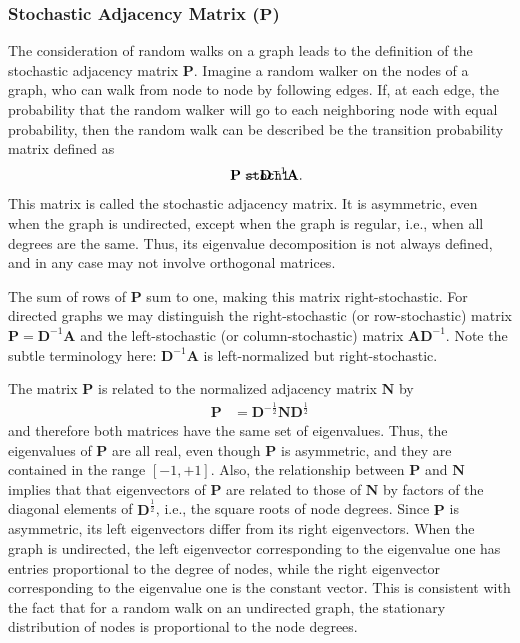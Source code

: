 \documentclass{article}
\def\mathnote#1{%
  \tag*{\rlap{\hspace\marginparsep\smash{\parbox[t]{\marginparwidth}{#1}}}}
}
\begin{document}
\subsubsection{Stochastic Adjacency Matrix ($\mathbf P$)}
\label{sec:matrix.P}
The consideration of random walks on a graph leads to the definition of
the stochastic adjacency matrix $\mathbf P$.  Imagine a random walker on
the nodes of a graph, who can walk from node to node by following
edges.  If, at each edge, the probability that the random walker will go
to each neighboring node with equal probability, then the random walk
can be described be the transition probability matrix defined as
\begin{align}
  \mathnote{\texttt{stoch1}}
  \mathbf P &= \mathbf D^{-1} \mathbf A.
\end{align}
This matrix is called the stochastic adjacency matrix.  It is asymmetric,
even when the graph is undirected, except when the graph is regular,
i.e., when all degrees are the same.  
Thus, its eigenvalue decomposition
is not always defined, and in any case may not involve orthogonal
matrices. 

The sum of rows of $\mathbf P$ sum to one, making this matrix
right-stochastic. 
For directed graphs we may distinguish the right-stochastic (or
row-stochastic) matrix 
$\mathbf P = \mathbf D^{-1} \mathbf A$ and the left-stochastic (or column-stochastic)
matrix $\mathbf A \mathbf D^{-1}$.  Note the subtle terminology here:
$\mathbf D^{-1} \mathbf A$ is left-normalized but right-stochastic. 

The matrix $\mathbf P$ is related to the normalized adjacency matrix $\mathbf N$ by
\begin{align}
  \mathbf P &= \mathbf D^{-\frac 1 2} \mathbf N \mathbf D^{\frac 1 2}
\end{align}
and therefore both matrices have the same set of eigenvalues.
Thus, the eigenvalues of $\mathbf P$ are all real, even though
$\mathbf P$ is asymmetric, and they are contained in the range $[-1,+1]$. 
Also, the relationship between $\mathbf P$ and $\mathbf N$ implies that that
eigenvectors of $\mathbf P$ are related to those of 
$\mathbf N$ by factors of the diagonal elements of $\mathbf D^{\frac 1 2}$,
i.e., the square roots of node degrees. 
Since $\mathbf P$ is asymmetric, its left eigenvectors differ from its
right eigenvectors.  When the graph is undirected, the left eigenvector
corresponding to the eigenvalue one has entries proportional to the
degree of nodes, 
while the right eigenvector corresponding to the eigenvalue one 
is the constant vector.  This is consistent with the fact that for a
random walk on an undirected graph, the stationary distribution of nodes
is proportional to the node degrees. 
\end{document}

